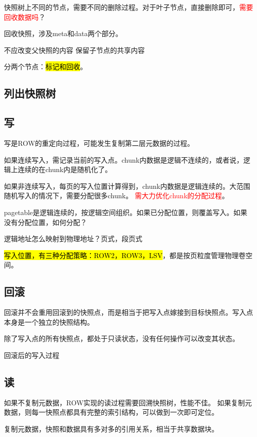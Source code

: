 快照树上不同的节点，需要不同的删除过程。对于叶子节点，直接删除即可，\textcolor{red}{需要回收数据吗}？

回收快照，涉及meta和data两个部分。

不应改变父快照的内容
保留子节点的共享内容

分两个节点：\hl{标记和回收}。

\subsection{列出快照树}

\subsection{写}

写是ROW的重定向过程，可能发生复制第二层元数据的过程。

如果连续写入，需记录当前的写入点。chunk内数据是逻辑不连续的，或者说，逻辑上连续的在chunk内是随机化了。

如果非连续写入，每页的写入位置计算得到，chunk内数据是逻辑连续的。大范围随机写入的情况下，需要分配很多chunk。
\textcolor{red}{需大力优化chunk的分配过程}。

pagetable是逻辑连续的，按逻辑空间组织。如果已分配位置，则覆盖写入。如果没有分配位置，如何分配？

逻辑地址怎么映射到物理地址？页式，段页式

\hl{写入位置，有三种分配策略：ROW2，ROW3，LSV}，都是按页粒度管理物理卷空间。

\subsection{回滚}

回滚并不会重用回滚到的快照点，而是相当于把写入点嫁接到目标快照点。写入点本身是一个独立的快照结构。

除了写入点的所有快照点，都处于只读状态，没有任何操作可以改变其状态。

回滚后的写入过程

\subsection{读}

如果不复制元数据，ROW实现的读过程需要回溯快照树，性能不佳。
如果复制元数据，则每一快照点都具有完整的索引结构，可以做到一次即可定位。

复制元数据，快照和数据具有多对多的引用关系，相当于共享数据块。

